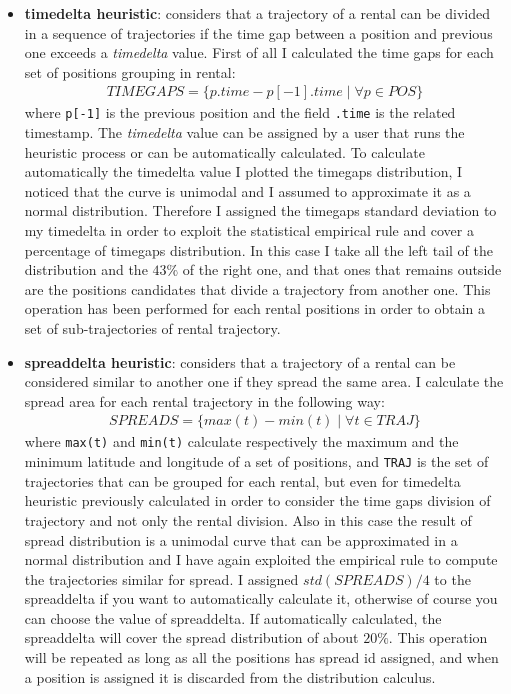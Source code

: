 \begin{itemize}
	\item \textbf{timedelta heuristic}: considers that a trajectory of a rental can be divided in a sequence of trajectories if the time gap between a position and previous one exceeds a \textit{timedelta} value. First of all I calculated the time gaps for each set of positions grouping in rental: 
	\begin{align}
		TIMEGAPS = \{p.time - p[-1].time \mid \forall p \in POS \}
	\end{align}
	where \verb|p[-1]| is the previous position and the field \verb|.time| is the related timestamp. The \textit{timedelta} value can be assigned by a user that runs the heuristic process or can be automatically calculated. To calculate automatically the timedelta value I plotted the timegaps distribution, I noticed that the curve is unimodal and I assumed to approximate it as a normal distribution. Therefore I assigned the timegaps standard deviation to my timedelta in order to exploit the statistical empirical rule and cover a percentage of timegaps distribution. In this case I take all the left tail of the distribution and the $43\%$ of the right one, and that ones that remains outside are the positions candidates that divide a trajectory from another one. This operation has been performed for each rental positions in order to obtain a set of sub-trajectories of rental trajectory.
	\item \textbf{spreaddelta heuristic}: considers that a trajectory of a rental can be considered similar to another one if they spread the same area. I calculate the spread area for each rental trajectory in the following way: 
	\begin{align}
		SPREADS = \{max(t) - min(t) \mid \forall t \in TRAJ \}
	\end{align}
	where \verb|max(t)| and \verb|min(t)| calculate respectively the maximum and the minimum latitude and longitude of a set of positions, and \verb|TRAJ| is the set of trajectories that can be grouped for each rental, but even for timedelta heuristic previously calculated in order to consider the time gaps division of trajectory and not only the rental division. Also in this case the result of spread distribution is a unimodal curve that can be approximated in a normal distribution and I have again exploited the empirical rule to compute the trajectories similar for spread. I assigned $std(SPREADS) / 4$ to the spreaddelta if you want to automatically calculate it, otherwise of course you can choose the value of spreaddelta. If automatically calculated, the spreaddelta will cover the spread distribution of about $20\%$. This operation will be repeated as long as all the positions has spread id assigned, and when a position is assigned it is discarded from the distribution calculus. 

\end{itemize}
